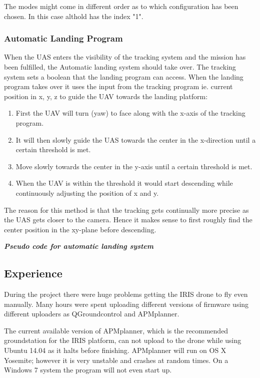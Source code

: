 The modes might come in different order as to which configuration has been chosen. In this case althold has the index "1".
\subsubsection{Automatic Landing Program}

When the UAS enters the visibility of the tracking system and the mission has been fulfilled, the Automatic landing system should take over.
The tracking system sets a boolean that the landing program can access. When the landing program takes over it uses the input from the tracking program ie. current position in x, y, z to guide the UAV towards the landing platform:

\begin{enumerate}
\item First the UAV will turn (yaw) to face along with the x-axis of the tracking program.
\item It will then slowly guide the UAS towards the center in the x-direction until a certain threshold is met.
\item Move slowly towards the center in the y-axis until a certain threshold is met.
\item When the UAV is within the threshold it would start descending while continuously adjusting the position of x and y.
\end{enumerate}
The reason for this method is that the tracking gets continually more precise as the UAS gets closer to the camera. Hence it makes sense to first roughly find the center position in the xy-plane before descending. 

\emph{\textbf{Pseudo code for automatic landing system}}
\lstset{tabsize=4}


\subsection{Experience}
During the project there were huge problems getting the IRIS drone to fly even manually. Many hours were spent uploading different versions of firmware using different uploaders as QGroundcontrol and APMplanner. 

The current available version of APMplanner, which is the recommended groundstation for the IRIS platform, can not upload to the drone while using Ubuntu 14.04 as it halts before finishing. APMplanner will run on OS X Yosemite; however it is very unstable and crashes at random times. On a Windows 7 system the program will not even start up.

